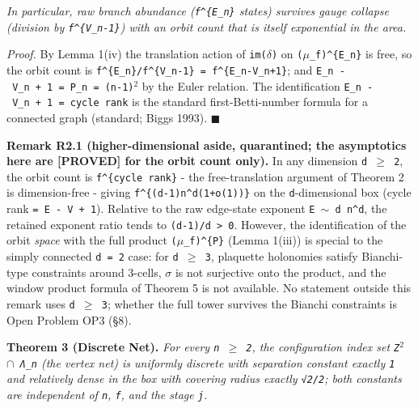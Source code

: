 \documentclass[
  american,
  11pt,
  letterpaper,
]{article}
\begin{document}
\emph{In particular, raw branch abundance (\texttt{f\^{}\{\textbar{}E\_n\textbar{}\}} states) survives gauge collapse (division by \texttt{f\^{}\{\textbar{}V\_n\textbar{}-1\}}) with an orbit count that is itself exponential in the area.}

\emph{Proof.} By Lemma 1(iv) the translation action of \texttt{im(\ensuremath{\delta})} on \texttt{(\ensuremath{\mu}\_f)\^{}\{E\_n\}} is free, so the orbit count is \texttt{f\^{}\{\textbar{}E\_n\textbar{}\}/f\^{}\{\textbar{}V\_n\textbar{}-1\}\ =\ f\^{}\{\textbar{}E\_n\textbar{}-\textbar{}V\_n\textbar{}+1\}}; and \texttt{\textbar{}E\_n\textbar{}\ -\ \textbar{}V\_n\textbar{}\ +\ 1\ =\ \textbar{}P\_n\textbar{}\ =\ (n-1)\ensuremath{{}^{2}}} by the Euler relation. The identification \texttt{\textbar{}E\_n\textbar{}\ -\ \textbar{}V\_n\textbar{}\ +\ 1\ =\ cycle\ rank} is the standard first-Betti-number formula for a connected graph (standard; Biggs 1993). \ensuremath{\blacksquare}

\textbf{Remark R2.1 (higher-dimensional aside, quarantined; the asymptotics here are {[}PROVED{]} for the orbit count only).} In any dimension \texttt{d\ \ensuremath{\geq}\ 2}, the orbit count is \texttt{f\^{}\{cycle\ rank\}} - the free-translation argument of Theorem 2 is dimension-free - giving \texttt{f\^{}\{(d-1)n\^{}d(1+o(1))\}} on the \texttt{d}-dimensional box (cycle rank \texttt{=\ \textbar{}E\textbar{}\ -\ \textbar{}V\textbar{}\ +\ 1}). Relative to the raw edge-state exponent \texttt{\textbar{}E\textbar{}\ \ensuremath{\sim}\ d\ n\^{}d}, the retained exponent ratio tends to \texttt{(d-1)/d\ \textgreater{}\ 0}. However, the identification of the orbit \emph{space} with the full product \texttt{(\ensuremath{\mu}\_f)\^{}\{P\}} (Lemma 1(iii)) is special to the simply connected \texttt{d\ =\ 2} case: for \texttt{d\ \ensuremath{\geq}\ 3}, plaquette holonomies satisfy Bianchi-type constraints around 3-cells, \texttt{\ensuremath{\sigma}} is not surjective onto the product, and the window product formula of Theorem 5 is not available. No statement outside this remark uses \texttt{d\ \ensuremath{\geq}\ 3}; whether the full tower survives the Bianchi constraints is Open Problem OP3 (§8).

\textbf{Theorem 3 (Discrete Net).} \emph{For every \texttt{n\ \ensuremath{\geq}\ 2}, the configuration index set \texttt{Z\ensuremath{{}^{2}}\ \ensuremath{\cap}\ Λ\_n} (the vertex net) is uniformly discrete with separation constant exactly \texttt{1} and relatively dense in the box with covering radius exactly \texttt{√2/2}; both constants are independent of \texttt{n}, \texttt{f}, and the stage \texttt{j}.}
\end{document}
